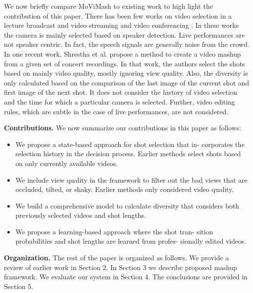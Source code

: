 \documentclass{sig-alternate}
\begin{document}
We now briefly compare MoViMash to existing work to high light the contribution of this paper. There has been few works on video selection in a lecture broadcast and video streaming \cite{21} \cite{6}
and video conferencing \cite{3}. In these works the camera is mainly
selected based on speaker detection. Live performances are not
speaker centric. In fact, the speech signals are generally noise from
the crowd. In one recent work, Shrestha et al. \cite{15} propose a method to create a video mashup from a given set of concert recordings. In that work, the authors select the shots based on mainly video quality, mostly ignoring view quality. Also, the diversity is only calculated based on the comparison of the last image of the current shot and first image of the next shot. It does not consider the history of video selection and the time for which a particular camera is selected. Further, video editing rules, which are subtle in the case of live performances, are not considered. 

\textbf{Contributions.} We now summarize our contributions in this paper as follows:

\begin{itemize}
\item We propose a state-based approach for shot selection that in-
corporates the selection history in the decision process. Earlier methods select shots based on only currently available videos.
\item  We include view quality in the framework to filter out the
bad views that are occluded, tilted, or shaky. Earlier methods
only considered video quality.
\item  We build a comprehensive model to calculate diversity that
considers both previously selected videos and shot lengths.
\item  We propose a learning-based approach where the shot tran-
sition probabilities and shot lengths are learned from profes-
sionally edited videos.
\end{itemize}

\textbf{Organization.} The rest of the paper is organized as follows.
We provide a review of earlier work in Section 2. In Section 3 we
describe proposed mashup framework. We evaluate our system in
Section 4. The conclusions are provided in Section 5.
\end{document}
